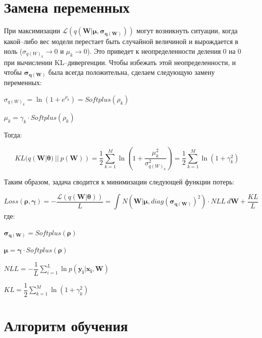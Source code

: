 \documentclass{article}
\begin{document}
\section{Замена переменных}

При максимизации $\mathcal{L}(q(\pmb{W} | \pmb{\mu}, \pmb{\sigma_{q(\pmb{W})}}))$ могут возникнуть ситуации, когда какой--либо вес модели перестает быть случайной величиной и вырождается в ноль ($\sigma_{{q(W)_{k}}} \rightarrow 0$ и $\mu_{k} \rightarrow 0$). Это приведет к неопределенности деления 0 на 0 при вычислении KL--дивергенции. Чтобы избежать этой неопределенности, и чтобы $\pmb{\sigma_{q(\pmb{W})}}$ была всегда положительна, сделаем следующую замену переменных:

$\sigma_{{q(W)_{k}}} = \ln({1 + e^{\rho_{k}}}) = Softplus(\rho_{k})$

$\mu_{k} = \gamma_{k} \cdot Softplus(\rho_{k})$

Тогда:

\[
KL(q(\pmb{W} | \pmb{\theta})~||~p(\pmb{W})) =
\dfrac{1}{2}\sum_{k=1}^{M}\ln({1 + \dfrac{\mu_{k}^2}{\sigma_{{q(W)_{k}}}^2}}) =
\dfrac{1}{2}\sum_{k=1}^{M}\ln({1 + \gamma_{k}^{2}})
\]

Таким образом, задача сводится к минимизации следующей функции потерь:

\[
Loss(\pmb{\rho}, \pmb{\gamma}) =
- \dfrac{\mathcal{L}(q(\pmb{W} | \pmb{\theta}))}{L} =
\int_{}{} N(\pmb{W} | \pmb{\mu}, diag(\pmb{\sigma_{q(\pmb{W})}})^{2}) \cdot NLL ~ d \pmb{W} + \dfrac{KL}{L}
\] где:

$\pmb{\sigma_{q(\pmb{W})}} = Softplus(\pmb{\rho})$

$\pmb{\mu} = \pmb{\gamma} \cdot Softplus(\pmb{\rho})$

$NLL = -\dfrac{1}{L}\sum_{i=1}^{L}{\ln{p( \pmb{y_{i}} | \pmb{x_{i}}, \pmb{W})}}$

$KL = \dfrac{1}{2}\sum_{k=1}^{M}\ln({1 + \gamma_{k}^{2}})$

\section{Алгоритм обучения}
\end{document}
